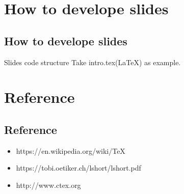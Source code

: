 \documentclass{beamer}
\begin{document}
\section{How to develope slides}
\subsection{How to develope slides}
\begin{frame}{Slides code structure}
  Take intro.tex(\LaTeX) as example.
\end{frame}

\section{Reference}
\subsection{Reference}
\begin{frame}
  \begin{itemize}
    \item https://en.wikipedia.org/wiki/TeX
    \item https://tobi.oetiker.ch/lshort/lshort.pdf
    \item http://www.ctex.org
  \end{itemize}
\end{frame}
\end{document}
